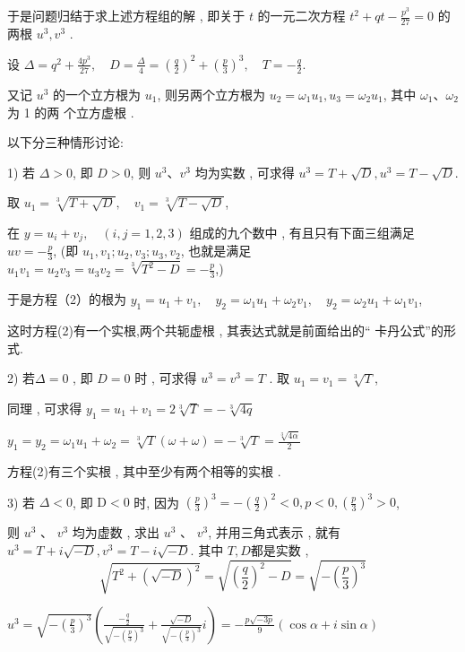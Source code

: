 于是问题归结于求上述方程组的解 , 即关于 $t$ 的一元二次方程 $t^{2}+q t-\frac{p^{3}}{27}=0$ 的两根 $u^{3}, v^{3}$  .  

设 $\Delta=q^{2}+\frac{4 p^{3}}{27}, \quad D=\frac{\Delta}{4}=\left(\frac{q}{2}\right)^{2}+\left(\frac{p}{3}\right)^{3}, \quad T=-\frac{q}{2}.$

又记 $u^{3}$ 的一个立方根为 $u_{1}$, 则另两个立方根为 $u_{2}=\omega_{1} u_{1}, u_{3}=\omega_{2} u_{1}$, 其中 $\omega_{1} 、 \omega_{2}$ 为 1 的两 个立方虚根 . 

以下分三种情形讨论:

1) 若 $\Delta>0$, 即 $D>0$, 则 $u^{3} 、 v^{3}$ 均为实数 , 可求得 $u^{3}=T+\sqrt{D}, u^{3}=T-\sqrt{D}$. 

取 $u_{1}=\sqrt[3]{T+\sqrt{D}}, \quad v_{1}=\sqrt[3]{T-\sqrt{D}}$,

在 $y=u_{i}+v_{j}, \quad(i, j=1,2,3)$ 组成的九个数中 , 有且只有下面三组满足 $u v=-\frac{p}{3}$,
(即 $u_{1}, v_{1} ; u_{2}, v_{3} ; u_{3}, v_{2}$, 也就是满足 $u_{1} v_{1}=u_{2} v_{3}=u_{3} v_{2}=\sqrt[3]{T^{2}-D}=-\frac{p}{3}$,)

于是方程（2）的根为 
$y_{1}=u_{1}+v_{1}, \quad 
y_{2}=\omega_{1} u_{1}+\omega_{2} v_{1}, \quad 
y_{2}=\omega_{2} u_{1}+\omega_{1} v_{1}$,

这时方程(2)有一个实根,两个共轭虚根 , 其表达式就是前面给出的“ 卡丹公式”的形式.

2) 若$\Delta=0$ , 即 $D=0$ 时 , 可求得 $u^{3}=v^{3}=T$  . 取 $u_{1}=v_{1}=\sqrt[3]{T}$,

同理 , 可求得 $y_{1}=u_{1}+v_{1}=2 \sqrt[3]{T}=-\sqrt[3]{4 q}$

$y_1=y_2=\omega_1 u_1+\omega_2 =\sqrt[3]{T}(\omega+\omega)=-\sqrt[3]{T}=\frac{\sqrt[3]{4 \alpha}}{2}$

方程(2)有三个实根 , 其中至少有两个相等的实根 . 

3) 若 $\Delta<0$, 即 $\mathrm{D}<0$ 时, 因为 $\left(\frac{p}{3}\right)^{3}=-\left(\frac{q}{2}\right)^{2}<0, p<0,\left(\frac{p}{3}\right)^{3}>0$,

则 $u^{3}$ 、 $v^{3}$ 均为虚数 , 求出 $u^{3}$ 、 $v^{3}$, 并用三角式表示 , 就有 $u^{3}=T+i \sqrt{-D}, v^{3}=T-i \sqrt{-D} .$ 其中 $T,D$都是实数 , 
\[
\sqrt{T^{2}+(\sqrt{-D})^{2}}=\sqrt{\left(\frac{q}{2}\right)^{2}-D}=\sqrt{-\left(\frac{p}{3}\right)^{3}}
\]

$u^{3}=\sqrt{-\left(\frac{p}{3}\right)^{3}}\left(\frac{-\frac{q}{2}}{\sqrt{-\left(\frac{p}{3}\right)^{3}}}+\frac{\sqrt{-D}}{\sqrt{-\left(\frac{p}{3}\right)^{3}}} i\right)=-\frac{p \sqrt{-3 p}}{9}(\cos \alpha+i \sin \alpha)$



